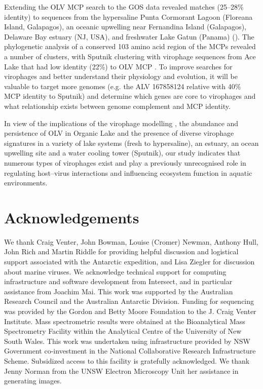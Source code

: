 Extending the \ac{OLV} \ac{MCP} search to the \ac{GOS} data revealed matches (25--28\% identity) to sequences from the hypersaline Punta Cormorant Lagoon (Floreana Island, Galapagos), an oceanic upwelling near Fernandina Island (Galapagos), Delaware Bay estuary (\textsc{NJ}, \textsc{USA}), and freshwater Lake Gatun (Panama) (). 
The phylogenetic analysis of a conserved 103 amino acid region of the \acp{MCP} revealed a number of clusters, with Sputnik clustering with virophage sequences from Ace Lake that had low identity (22\%) to \ac{OLV} \ac{MCP} . 
To improve searches for virophages and better understand their physiology and evolution, it will be valuable to target more genomes (e.g. the \ac{ALV} 167858124 relative with 40\% MCP identity to Sputnik) and determine which genes are core to virophages and what relationship exists between genome complement and \ac{MCP} identity.
 
In view of the implications of the virophage modelling , the abundance and persistence of \ac{OLV} in Organic Lake and the presence of diverse virophage signatures in a variety of lake systems (fresh to hypersaline), an estuary, an ocean upwelling site and a water cooling tower (Sputnik), our study indicates that numerous types of virophages exist and play a previously unrecognised role in regulating host--virus interactions and influencing ecosystem function in aquatic environments. 


\section{Acknowledgements}
We thank Craig Venter, John Bowman, Louise (Cromer) Newman, Anthony Hull, John Rich and Martin Riddle for providing helpful discussion and logistical support associated with the Antarctic expedition, and Lisa Ziegler for discussion about marine viruses. 
We acknowledge technical support for computing infrastructure and software development from Intersect, and in particular assistance from Joachim Mai. 
This work was supported by the Australian Research Council and the Australian Antarctic Division. 
Funding for sequencing was provided by the Gordon and Betty Moore Foundation to the J. Craig Venter Institute. 
Mass spectrometric results were obtained at the Bioanalytical Mass Spectrometry Facility within the Analytical Centre of the University of New South Wales. 
This work was undertaken using infrastructure provided by NSW Government co-investment in the National Collaborative Research Infrastructure Scheme. 
Subsidized access to this facility is gratefully acknowledged. 
We thank Jenny Norman from the UNSW Electron Microscopy Unit her assistance in generating images. 
